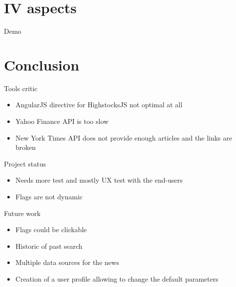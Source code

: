 \documentclass{beamer}
\begin{document}
\section{IV aspects}
\begin{frame}{Demo}
\end{frame}

\section{Conclusion}
\begin{frame}{Tools critic}
    \begin{itemize}
        \item AngularJS directive for HighstocksJS not optimal at all
        \item Yahoo Finance API is too slow
        \item New York Times API does not provide enough articles and the links are broken
    \end{itemize}
\end{frame}

\begin{frame}{Project status}
    \begin{itemize}
        \item Needs more test and mostly UX test with the end-users
        \item Flags are not dynamic
    \end{itemize}
\end{frame}

\begin{frame}{Future work}
    \begin{itemize}
        \item Flags could be clickable
        \item Historic of past search
        \item Multiple data sources for the news
        \item Creation of a user profile allowing to change the default parameters
    \end{itemize}
\end{frame}

\end{document}
